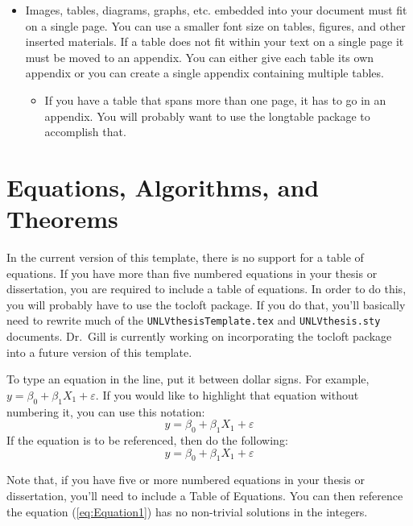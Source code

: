 \begin{itemize}
\begin{itemize}
		\end{itemize}
	\item Images, tables, diagrams, graphs, etc. embedded into your document must fit on a single page. You can use a smaller font size on tables, figures, and other inserted materials. If a table does not fit within your text on a single page it must be moved to an appendix. You can either give	each table its own appendix or you can create a single appendix containing multiple tables.
		\begin{itemize}
			\item If you have a table that spans more than one page, it has to go in an appendix. You will probably want to use the \textsf{longtable} package to accomplish that. 
		\end{itemize}

\end{itemize} 

\section{Equations, Algorithms, and Theorems}

In the current version of this template, there is no support for a table of equations. If you have more than five numbered equations in your thesis or dissertation, you are required to include a table of equations. In order to do this, you will probably have to use the \textsf{tocloft} package. If you do that, you'll basically need to rewrite much of the \texttt{UNLVthesisTemplate.tex} and \texttt{UNLVthesis.sty} documents. Dr.\ Gill is currently working on incorporating the \textsf{tocloft} package into a future version of this template.

To type an equation in the line, put it between dollar signs.  For
example, $y = \beta_0 + \beta_1 X_1 + \varepsilon$.  If you would like to highlight that equation without numbering it, you can use this notation:  $$y = \beta_0 + \beta_1 X_1 + \varepsilon$$
If the equation is to be referenced, then do the following:
\begin{equation}\label{eq:Equation1}
	y = \beta_0 + \beta_1 X_1 + \varepsilon
\end{equation}

Note that, if you have five or more numbered equations in your thesis or dissertation, you'll need to include a Table of Equations. You can then reference the equation (\cref{eq:Equation1}) has no
non-trivial solutions in the integers. 

